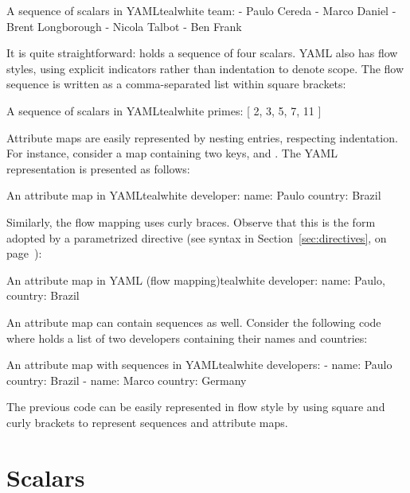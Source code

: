 \begin{codebox}{A sequence of scalars in YAML}{teal}{\icnote}{white}
team:
- Paulo Cereda
- Marco Daniel
- Brent Longborough
- Nicola Talbot
- Ben Frank
\end{codebox}

It is quite straightforward:  holds a sequence of four scalars. YAML also has flow styles, using explicit indicators rather than indentation to denote scope. The flow sequence is written as a comma-separated list within square brackets:

\begin{codebox}{A sequence of scalars in YAML}{teal}{\icnote}{white}
primes: [ 2, 3, 5, 7, 11 ]
\end{codebox}

Attribute maps are easily represented by nesting entries, respecting indentation. For instance, consider a map  containing two keys,  and . The YAML representation is presented as follows:

\begin{codebox}{An attribute map in YAML}{teal}{\icnote}{white}
developer:
 name: Paulo
 country: Brazil
\end{codebox}

Similarly, the flow mapping uses curly braces. Observe that this is the form adopted by a parametrized directive (see syntax in Section~\ref{sec:directives}, on page~\pageref{sec:directives}):

\begin{codebox}{An attribute map in YAML (flow mapping)}{teal}{\icnote}{white}
developer: { name: Paulo, country: Brazil }
\end{codebox}

An attribute map can contain sequences as well. Consider the following code where  holds a list of two developers containing their names and countries:

\begin{codebox}{An attribute map with sequences in YAML}{teal}{\icnote}{white}
developers:
- name: Paulo
  country: Brazil
- name: Marco
  country: Germany
\end{codebox}

The previous code can be easily represented in flow style by using square and curly brackets to represent sequences and attribute maps.

\section{Scalars}
\label{sec:yamlscalars}

